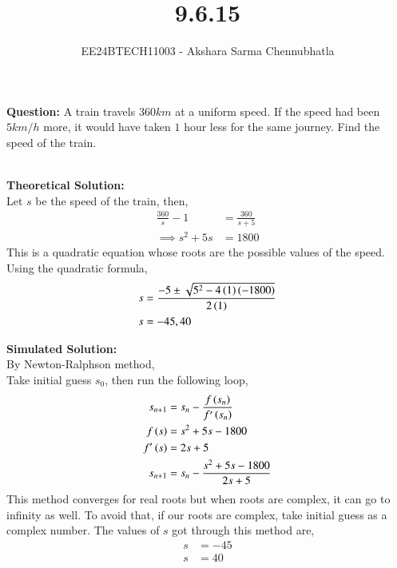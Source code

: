 \documentclass[journal, article]{IEEEtran}
\begin{document}

\vspace{3cm}

\title{9.6.15}
\author{EE24BTECH11003 - Akshara Sarma Chennubhatla}
{\let\newpage\relax\maketitle}
\textbf{Question:}
A train travels $360km$ at a uniform speed. If the speed had been $5km/h$ more, it would have taken $1$ hour less for the same journey. Find the speed of the train.

\solution\\
\textbf{Theoretical Solution:}\\

Let $s$ be the speed of the train, then,
\begin{align}
	\frac{360}{s} - 1 &= \frac{360}{s + 5}\\
	\implies s^2 + 5s &= 1800
\end{align}
This is a quadratic equation whose roots are the possible values of the speed.\\
Using the quadratic formula,
\begin{align}
	s &= \frac{-5 \pm \sqrt{5^2 - 4\left(1\right)\left(-1800\right)}}{2\left(1\right)}\\
	s &= -45, 40
\end{align}

\textbf{Simulated Solution:}\\

By Newton-Ralphson method,\\
Take initial guess $s_0$, then run the following loop,
\begin{align}
	s_{n+1} &= s_n - \frac{f\left(s_n\right)}{f^\prime\left(s_n\right)}\\
	f\left(s\right) &= s^2 + 5s - 1800\\
	f^\prime\left(s\right) &= 2s + 5\\
	s_{n+1} &= s_n - \frac{s^2 + 5s - 1800}{2s + 5}
\end{align}
This method converges for real roots but when roots are complex, it can go to infinity as well. To avoid that, if our roots are complex, take initial guess as a complex number.
The values of $s$ got through this method are,
\begin{align}
	s &= -45\\
	s &= 40
\end{align}
\end{document}
